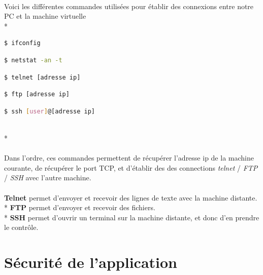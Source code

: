 \documentclass{article}
\begin{document}
\paragraph{}
Voici les diff\'{e}rentes commandes utilis\'{e}es pour \'{e}tablir des connexions entre notre PC et la machine virtuelle \\*
\begin{tcolorbox}
\begin{lstlisting}[language=sh]
$ ifconfig
\end{lstlisting}
\begin{lstlisting}[language=sh]
$ netstat -an -t
\end{lstlisting}
\begin{lstlisting}[language=sh]
$ telnet [adresse ip]
\end{lstlisting}
\begin{lstlisting}[language=sh]
$ ftp [adresse ip]
\end{lstlisting}
\begin{lstlisting}[language=sh]
$ ssh [user]@[adresse ip]
\end{lstlisting}
\end{tcolorbox}
~\\*
\paragraph{}
Dans l'ordre, ces commandes permettent de r\'{e}cup\'{e}rer l'adresse ip de la machine courante, de r\'{e}cup\'{e}rer le port TCP, et d'\'{e}tablir des des connections \textit{telnet} / \textit{FTP} / \textit{SSH} avec l'autre machine.

\paragraph{}
\textbf{Telnet} permet d'envoyer et recevoir des lignes de texte avec la machine distante. \\*
\textbf{FTP} permet d'envoyer et recevoir des fichiers. \\*
\textbf{SSH} permet d'ouvrir un terminal sur la machine distante, et donc d'en prendre le contr\^{o}le.
 

\section{S\'{e}curit\'{e} de l'application}
\end{document}
